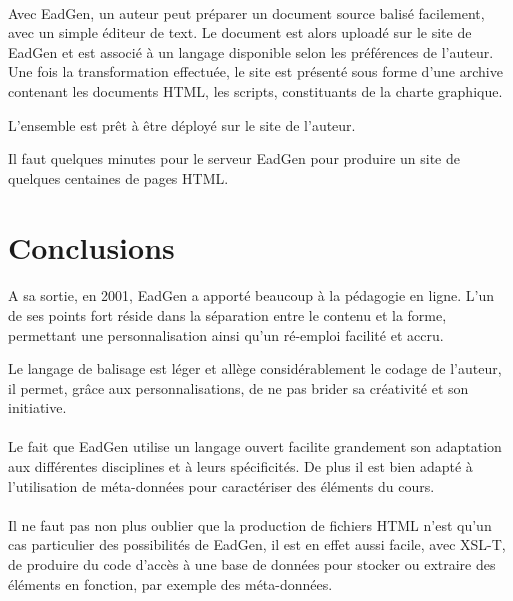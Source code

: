 \paragraph{}Avec EadGen, un auteur peut préparer un document source balisé facilement, avec un simple éditeur de text. Le document est alors uploadé sur le site de EadGen et est associé à un langage disponible selon les préférences de l'auteur. Une fois la transformation effectuée, le site est présenté sous forme d'une archive contenant les documents HTML, les scripts, constituants de la charte graphique. 

L'ensemble est prêt à être déployé sur le site de l'auteur.

Il faut quelques minutes pour le serveur EadGen pour produire un site de quelques centaines de pages HTML.





\section{Conclusions}


\paragraph{}A sa sortie, en 2001, EadGen a apporté beaucoup à la pédagogie en ligne. L'un de ses points fort réside dans la séparation entre le contenu et la forme, permettant une personnalisation ainsi qu'un ré-emploi facilité et accru.


Le langage de balisage est léger et allège considérablement le codage de l'auteur, il permet, grâce aux personnalisations, de ne pas brider sa créativité et son initiative.


\paragraph{}Le fait que EadGen utilise un langage ouvert facilite grandement son adaptation aux différentes disciplines et à leurs spécificités. De plus il est bien adapté à l'utilisation de méta-données pour caractériser des éléments du cours. 


\paragraph{}Il ne faut pas non plus oublier que la production de fichiers HTML n'est qu'un cas particulier des possibilités de EadGen, il est en effet aussi facile, avec XSL-T, de produire du code d'accès à une base de données pour stocker ou extraire des éléments en fonction, par exemple des méta-données.